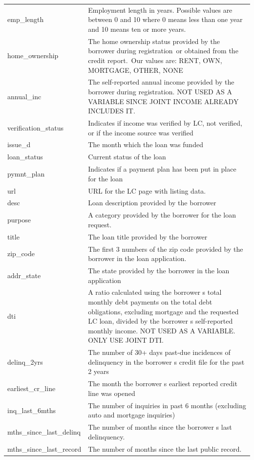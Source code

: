 \documentclass[11pt,]{report}
\begin{document}
\begin{longtable}[t]{>{\raggedright\arraybackslash}p{7cm}>{\raggedright\arraybackslash}p{7cm}}
\addlinespace
emp\_length & Employment length in years. Possible values are between 0 and 10 where 0 means less than one year and 10 means ten or more years.\\
home\_ownership & The home ownership status provided by the borrower during registration or obtained from the credit report. Our values are: RENT, OWN, MORTGAGE, OTHER, NONE\\
annual\_inc & The self-reported annual income provided by the borrower during registration. NOT USED AS A VARIABLE SINCE JOINT INCOME ALREADY INCLUDES IT.\\
verification\_status & Indicates if income was verified by LC, not verified, or if the income source was verified\\
issue\_d & The month which the loan was funded\\
\addlinespace
loan\_status & Current status of the loan\\
pymnt\_plan & Indicates if a payment plan has been put in place for the loan\\
url & URL for the LC page with listing data.\\
desc & Loan description provided by the borrower\\
purpose & A category provided by the borrower for the loan request.\\
\addlinespace
title & The loan title provided by the borrower\\
zip\_code & The first 3 numbers of the zip code provided by the borrower in the loan application.\\
addr\_state & The state provided by the borrower in the loan application\\
dti & A ratio calculated using the borrower s total monthly debt payments on the total debt obligations, excluding mortgage and the requested LC loan, divided by the borrower s self-reported monthly income. NOT USED AS A VARIABLE. ONLY USE JOINT DTI.\\
delinq\_2yrs & The number of 30+ days past-due incidences of delinquency in the borrower s credit file for the past 2 years\\
\addlinespace
earliest\_cr\_line & The month the borrower s earliest reported credit line was opened\\
inq\_last\_6mths & The number of inquiries in past 6 months (excluding auto and mortgage inquiries)\\
mths\_since\_last\_delinq & The number of months since the borrower s last delinquency.\\
mths\_since\_last\_record & The number of months since the last public record.\\

\end{longtable}
\end{document}
